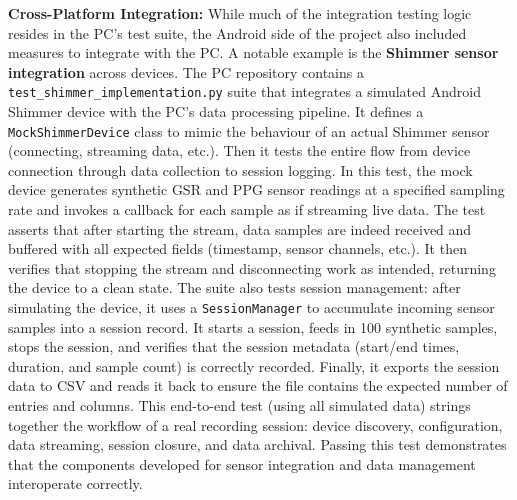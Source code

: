 \textbf{Cross-Platform Integration:} While much of the integration testing logic resides in the PC's test suite, the Android side of the project also included measures to integrate with the PC. A notable example is the \textbf{Shimmer sensor integration} across devices. The PC repository contains a \texttt{test\_shimmer\_implementation.py} suite that integrates a simulated Android Shimmer device with the PC's data processing pipeline. It defines a \texttt{MockShimmerDevice} class to mimic the behaviour of an actual Shimmer sensor (connecting, streaming data, etc.). Then it tests the entire flow from device connection through data collection to session logging. In this test, the mock device generates synthetic GSR and PPG sensor readings at a specified sampling rate and invokes a callback for each sample as if streaming live data. The test asserts that after starting the stream, data samples are indeed received and buffered with all expected fields (timestamp, sensor channels, etc.). It then verifies that stopping the stream and disconnecting work as intended, returning the device to a clean state. The suite also tests session management: after simulating the device, it uses a \texttt{SessionManager} to accumulate incoming sensor samples into a session record. It starts a session, feeds in 100 synthetic samples, stops the session, and verifies that the session metadata (start/end times, duration, and sample count) is correctly recorded. Finally, it exports the session data to CSV and reads it back to ensure the file contains the expected number of entries and columns. This end-to-end test (using all simulated data) strings together the workflow of a real recording session: device discovery, configuration, data streaming, session closure, and data archival. Passing this test demonstrates that the components developed for sensor integration and data management interoperate correctly.

